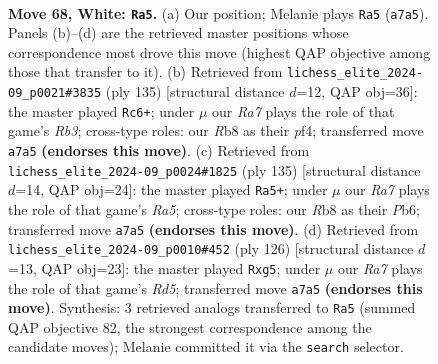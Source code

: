 \documentclass[11pt]{article}
\begin{document}
\clearpage

\begin{figure}[p]\centering
\begin{subfigure}{0.46\textwidth}\centering
\resizebox{\linewidth}{!}{%
\newchessgame
\chessboard[
  setfen={1R6/R4p2/4p1k1/8/P3P3/5PK1/8/4r3 w - - 27 68},
  showmover=false,
  pgfstyle=straightmove, color=movearrow, markmove={a7-a5}
]}
\caption{}
\end{subfigure}\hfill
\begin{subfigure}{0.46\textwidth}\centering
\resizebox{\linewidth}{!}{%
\newchessgame
\chessboard[
  setfen={8/R7/1r2p1k1/5p2/p4P2/P1K5/1P6/8 b - - 3 68},
  showmover=false,
  pgfstyle=straightmove, color=movearrow, markmove={b6-c6}
]}
\caption{}
\end{subfigure}
\\[4pt]
\begin{subfigure}{0.46\textwidth}\centering
\resizebox{\linewidth}{!}{%
\newchessgame
\chessboard[
  setfen={8/6R1/pp6/3K1kp1/r1P5/7P/7P/8 b - - 4 68},
  showmover=false,
  pgfstyle=straightmove, color=movearrow, markmove={a4-a5}
]}
\caption{}
\end{subfigure}\hfill
\begin{subfigure}{0.46\textwidth}\centering
\resizebox{\linewidth}{!}{%
\newchessgame
\chessboard[
  setfen={8/8/8/1P1R2p1/4r1P1/4p2P/6K1/4k3 w - - 6 64},
  showmover=false,
  pgfstyle=straightmove, color=movearrow, markmove={d5-g5}
]}
\caption{}
\end{subfigure}
\caption{\textbf{Move 68, White: \texttt{Ra5}.} (a) Our position; Melanie plays \texttt{Ra5} (\texttt{a7a5}). Panels (b)--(d) are the retrieved master positions whose correspondence most drove this move (highest QAP objective among those that transfer to it). (b) Retrieved from \texttt{lichess\_elite\_2024-09\_p0021\#3835} (ply 135) [structural distance $d$=12, QAP obj=36]: the master played \texttt{Rc6+}; under $\mu$ our \emph{Ra7} plays the role of that game's \emph{Rb3}; cross-type roles: our \emph{R}b8 as their \emph{p}f4; transferred move \texttt{a7a5} \textbf{(endorses this move)}. (c) Retrieved from \texttt{lichess\_elite\_2024-09\_p0024\#1825} (ply 135) [structural distance $d$=14, QAP obj=24]: the master played \texttt{Ra5+}; under $\mu$ our \emph{Ra7} plays the role of that game's \emph{Ra5}; cross-type roles: our \emph{R}b8 as their \emph{P}b6; transferred move \texttt{a7a5} \textbf{(endorses this move)}. (d) Retrieved from \texttt{lichess\_elite\_2024-09\_p0010\#452} (ply 126) [structural distance $d$=13, QAP obj=23]: the master played \texttt{Rxg5}; under $\mu$ our \emph{Ra7} plays the role of that game's \emph{Rd5}; transferred move \texttt{a7a5} \textbf{(endorses this move)}. Synthesis: 3 retrieved analogs transferred to \texttt{Ra5} (summed QAP objective 82, the strongest correspondence among the candidate moves); Melanie committed it via the \texttt{search} selector.}
\label{fig:thought-m134}
\end{figure}
\end{document}
